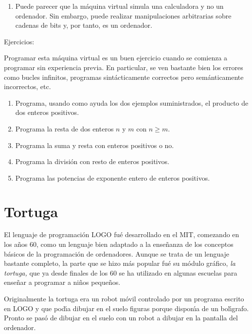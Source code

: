 \begin{appendices}
\begin{enumerate}
Disponiendo de \lstinline|for| e \lstinline|if| la m\'aquina virtual puede, de
hecho,
ejecutar cualquier algoritmo finito, aunque los programas, para casi cualquier
algoritmo,  ser\'{\i}an inmensos.

\item Puede parecer que la m\'aquina virtual simula una calculadora y no un
ordenador. Sin embargo, puede realizar manipulaciones arbitrarias sobre cadenas
de bits y, por tanto, es un ordenador.

\end{enumerate}
 
 
 

{\sc Ejercicios:}

Programar esta m\'aquina virtual es un buen ejercicio cuando se comienza a
programar sin experiencia previa. En particular, se ven bastante bien los
errores como bucles infinitos, programas sint\'acticamente correctos pero
sem\'anticamente incorrectos, etc.

\begin{enumerate}
 \item Programa, usando como ayuda los dos ejemplos suministrados,  el producto
de dos enteros positivos.
 
 \item Programa la resta de dos enteros $n$ y $m$ con $n\ge m$. 
 
 \item Programa la suma y resta con enteros positivos o no. 
 
 \item Programa la divisi\'on con resto de enteros positivos.
 
 \item Programa las potencias de exponente entero de enteros positivos.
\end{enumerate}


\chapter{Tortuga}
El lenguaje de programaci\'on LOGO fu\'e desarrollado en el MIT, comezando en
los a\~nos 60,  como un lenguaje bien adaptado a la ense\~nanza de los
conceptos b\'asicos de la programaci\'on de ordenadores. Aunque se trata de un
lenguaje bastante completo, la parte que se hizo m\'as popular fu\'e su m\'odulo
gr\'afico, {\itshape la tortuga,} que ya desde finales de los 60 se ha
utilizado en algunas escuelas para ense\~nar  a programar a ni\~nos peque\~nos.


Originalmente la tortuga era un robot m\'ovil controlado por un programa escrito
en LOGO y que pod\'{\i}a dibujar en el suelo figuras porque dispon\'{\i}a de un
bol\'{\i}grafo. Pronto se pas\'o de dibujar en el suelo con un robot a dibujar
en la pantalla del ordenador.



\end{appendices}
